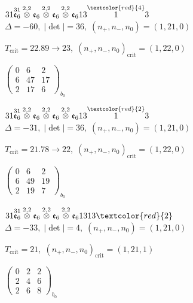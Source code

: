 \documentclass[10pt]{article}
\begin{document}
\smallskip

$31\overset{31}{\mathfrak{e}_6}\overset{2,2}{\otimes}\mathfrak{e}_6\overset{2,2}{\otimes}\mathfrak{e}_6\overset{2,2}{\otimes}\mathfrak{e}_613\overset{\textcolor{red}{4}}{1}3$ \quad $\Delta=-60,\; |\det|=36,\; (n_+,n_-,n_0)=(1,21,0)$

\hspace{1em}$T_{\text{crit}}=22.89 \to 23,\; (n_+,n_-,n_0)_{\text{crit}}=(1,22,0)$

\hspace{2em}$\left(\begin{smallmatrix}0 & 6 & 2 \\ 6 & 47 & 17 \\ 2 & 17 & 6\end{smallmatrix}\right)_{\!b_0}$

$31\overset{31}{\mathfrak{e}_6}\overset{2,2}{\otimes}\mathfrak{e}_6\overset{2,2}{\otimes}\mathfrak{e}_6\overset{2,2}{\otimes}\mathfrak{e}_613\overset{\textcolor{red}{2}}{1}3$ \quad $\Delta=-31,\; |\det|=36,\; (n_+,n_-,n_0)=(1,21,0)$

\hspace{1em}$T_{\text{crit}}=21.78 \to 22,\; (n_+,n_-,n_0)_{\text{crit}}=(1,22,0)$

\hspace{2em}$\left(\begin{smallmatrix}0 & 6 & 2 \\ 6 & 49 & 19 \\ 2 & 19 & 7\end{smallmatrix}\right)_{\!b_0}$

$31\overset{31}{\mathfrak{e}_6}\overset{2,2}{\otimes}\mathfrak{e}_6\overset{2,2}{\otimes}\mathfrak{e}_6\overset{2,2}{\otimes}\mathfrak{e}_61313\textcolor{red}{2}$ \quad $\Delta=-33,\; |\det|=4,\; (n_+,n_-,n_0)=(1,21,0)$

\hspace{1em}$T_{\text{crit}}=21,\; (n_+,n_-,n_0)_{\text{crit}}=(1,21,1)$

\hspace{2em}$\left(\begin{smallmatrix}0 & 2 & 2 \\ 2 & 4 & 6 \\ 2 & 6 & 8\end{smallmatrix}\right)_{\!b_0}$

\smallskip
\end{document}
